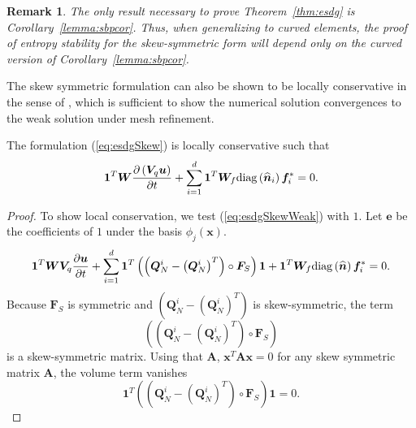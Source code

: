 \documentclass[review]{siamart0216}
\newtheorem*{remark}{Remark}
\theoremstyle{assumption}
\renewcommand{\hat}[1]{\widehat{#1}}
\newcommand{\pd}[2]{\frac{\partial#1}{\partial#2}}
\newcommand{\LRp}[1]{\left( #1 \right)}
\newcommand{\diag}[1]{{\rm diag}\LRp{#1}}
\begin{document}
\begin{remark}
The only result necessary to prove Theorem~\ref{thm:esdg} is Corollary~\ref{lemma:sbpcor}.  Thus, when generalizing to curved elements, the proof of entropy stability for the skew-symmetric form will depend only on the curved version of Corollary~\ref{lemma:sbpcor}.
\end{remark}

The skew symmetric formulation can also be shown to be locally conservative in the sense of \cite{shi2017local}, which is sufficient to show the numerical solution convergences to the weak solution under mesh refinement.  
\begin{theorem}
The formulation (\ref{eq:esdgSkew}) is locally conservative such that
\begin{align}
\bm{1}^T\bm{W}\pd{\LRp{\bm{V}_q\bm{u}}}{t} + \sum_{i=1}^d\bm{1}^T\bm{W}_f \diag{\hat{\bm{n}}_i}\bm{f}_i^* = 0. 
\end{align}
\end{theorem}
\begin{proof}
To show local conservation, we test (\ref{eq:esdgSkewWeak}) with $1$.  Let $\bm{e}$ be the coefficients of $1$ under the basis $\phi_j(\bm{x})$.
\begin{align}
\bm{1}^T\bm{W}\bm{V}_q\pd{\bm{u}}{t} + \sum_{i=1}^d
\bm{1}^T
\LRp{\LRp{\bm{Q}^i_N - \LRp{\bm{Q}^i_N}^T} \circ \bm{F}_S}\bm{1} + \bm{1}^T\bm{W}_f \diag{\hat{\bm{n}}}\bm{f}_i^* = 0. 
\end{align}
Because $\bm{F}_S$ is symmetric and $\LRp{\bm{Q}^i_N - \LRp{\bm{Q}^i_N}^T}$ is skew-symmetric, the term 
\[
\LRp{\LRp{\bm{Q}^i_N - \LRp{\bm{Q}^i_N}^T} \circ \bm{F}_S}
\]
is a skew-symmetric matrix.  Using that $\bm{A}$, $\bm{x}^T\bm{A}\bm{x} = 0$ for any skew symmetric matrix $\bm{A}$, the volume term vanishes
\[
\bm{1}^T\LRp{\LRp{\bm{Q}^i_N - \LRp{\bm{Q}^i_N}^T} \circ \bm{F}_S}\bm{1} = 0.
\]
\end{proof}
\end{document}
